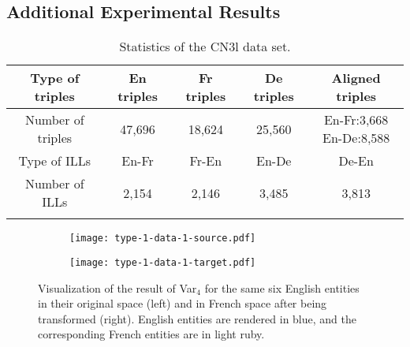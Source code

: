 \documentclass{article}
\begin{document}
\subsection{Additional Experimental Results}


\begin{table}[t!]
\centering
\caption{Statistics of the CN3l data set.}
\label{tbl:CN3l}
\vspace{-1em}
\scriptsize
\begin{tabular}{c|cccc}
\bhline
Type of triples&En triples&Fr triples&De triples&Aligned triples\\
\hline
Number of triples&47,696&18,624&25,560&\makecell{En-Fr:3,668\\En-De:8,588}\\
\bhline
Type of ILLs&En-Fr&Fr-En&En-De&De-En\\
\hline
Number of ILLs&2,154&2,146&3,485&3,813\\
\bhline
\end{tabular}
\vspace{-1em}
\end{table}



\begin{figure*}[t]
\vspace{-1.5em}
\centering
\begin{subfigure}[c]{0.4\textwidth}
\centering
\texttt{[image: type-1-data-1-source.pdf]}
\end{subfigure}
\hspace{5em}
\begin{subfigure}[c]{0.4\textwidth}
\centering
\texttt{[image: type-1-data-1-target.pdf]}
\end{subfigure}
\vspace{-2em}
\caption{Visualization of
the result of Var$_4$ for
the same six English entities in their original space (left) and in French space after being transformed (right).
English entities are
rendered in blue, and
the corresponding French entities are
in light ruby.
}
\label{fig:viz}
\end{figure*}
\end{document}
